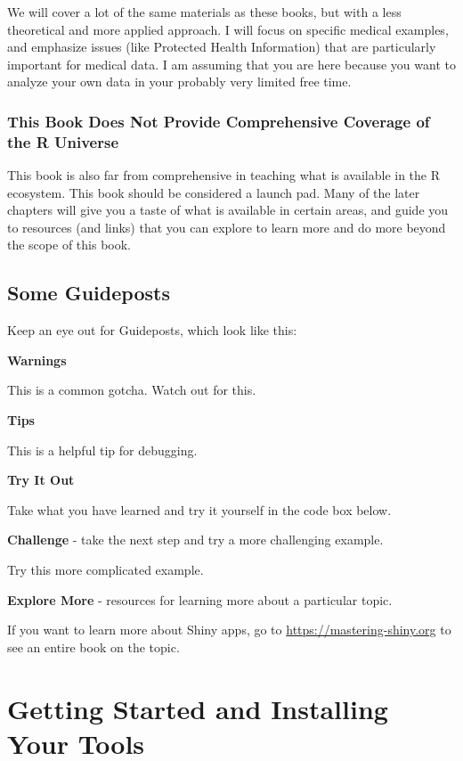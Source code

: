 \documentclass[]{book}
\begin{document}
We will cover a lot of the same materials as these books, but with a less theoretical and more applied approach. I will focus on specific medical examples, and emphasize issues (like Protected Health Information) that are particularly important for medical data. I am assuming that you are here because you want to analyze your own data in your probably very limited free time.

\hypertarget{this-book-does-not-provide-comprehensive-coverage-of-the-r-universe}{%
\subsection{This Book Does Not Provide Comprehensive Coverage of the R Universe}\label{this-book-does-not-provide-comprehensive-coverage-of-the-r-universe}}

This book is also far from comprehensive in teaching what is available in the R ecosystem. This book should be considered a launch pad. Many of the later chapters will give you a taste of what is available in certain areas, and guide you to resources (and links) that you can explore to learn more and do more beyond the scope of this book.

\hypertarget{some-guideposts}{%
\section{Some Guideposts}\label{some-guideposts}}

Keep an eye out for Guideposts, which look like this:

\textbf{Warnings}

This is a common gotcha. Watch out for this.

\textbf{Tips}

This is a helpful tip for debugging.

\textbf{Try It Out}

Take what you have learned and try it yourself in the code box below.

\textbf{Challenge} - take the next step and try a more challenging example.

Try this more complicated example.

\textbf{Explore More} - resources for learning more about a particular topic.

If you want to learn more about Shiny apps, go to \url{https://mastering-shiny.org} to see an entire book on the topic.

\hypertarget{getting-started-and-installing-your-tools}{%
\chapter{Getting Started and Installing Your Tools}\label{getting-started-and-installing-your-tools}}
\end{document}
